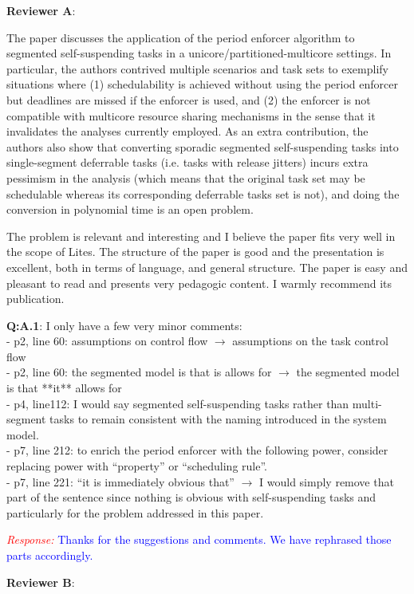 \documentclass[12pt]{article}
\newcommand{\response}[1]{\textcolor{red}{\emph{Response: }} \textcolor{blue}{#1}\vspace{0.25in}}
\begin{document}
{\bf Reviewer A}:

	The paper discusses the application of the period enforcer algorithm to
segmented self-suspending tasks in a unicore/partitioned-multicore settings.
In particular, the authors contrived multiple scenarios and task sets to
exemplify situations where (1) schedulability is achieved without using the
period enforcer but deadlines are missed if the enforcer is used, and (2)
the enforcer is not compatible with multicore resource sharing mechanisms in
the sense that it invalidates the analyses currently employed. As an extra
contribution, the authors also show that converting sporadic segmented
self-suspending tasks into single-segment deferrable tasks (i.e. tasks with
release jitters) incurs extra pessimism in the analysis (which means that
the original task set may be schedulable whereas its corresponding
deferrable tasks set is not), and doing the conversion in polynomial time
is an open problem.

The problem is relevant and interesting and I believe the paper fits very
well in the scope of Lites. The structure of the paper is good and the
presentation is excellent, both in terms of language, and general structure.
The paper is easy and pleasant to read and presents very pedagogic content.
I warmly recommend its publication.

{\bf Q:A.1}:    
I only have a few very minor comments:\\
- p2, line 60: assumptions on control flow $\rightarrow$ assumptions on
the task control flow\\
- p2, line 60: the segmented model is that is allows for $\rightarrow$ the
segmented model is that **it** allows for\\
- p4, line112: I would say segmented self-suspending tasks rather than
multi-segment tasks to remain consistent with the naming introduced in
the system model.\\
- p7, line 212:  to enrich the period enforcer with the following
power, consider replacing power with ``property'' or
``scheduling rule''.\\
- p7, line 221: ``it is immediately obvious that'' $\rightarrow$ I would simply
remove that part of the sentence since nothing is obvious with
self-suspending tasks and particularly for the problem addressed in this
paper.


\vskip 0.1in\noindent
\response{Thanks for the suggestions and comments. We have rephrased those parts accordingly.}

{\bf Reviewer B}:
\end{document}
